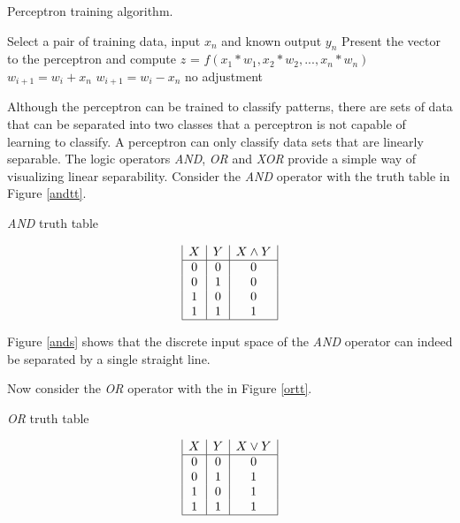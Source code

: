 \begin{algorithm}[htb!]
\caption{Perceptron training algorithm.}
\label{perceptronAlg}    
\begin{algorithmic}

\STATE Select a pair of training data, input $x_n$ and known output $y_n$
\STATE Present the vector to the perceptron and compute $z$ = $f(x_1 * w_1, x_2 * w_2, ..., x_n * w_n)$
\STATE $w_{i+1} = w_i + x_n$
\STATE $w_{i+1} = w_i - x_n$
 \ELSE
\STATE no adjustment
\ENDIF
\ENDWHILE
\end{algorithmic}
\end{algorithm}

Although the perceptron can be trained to classify patterns, there are sets of data that can be separated into two classes that a perceptron is not capable of learning to classify.
A perceptron can only classify data sets that are linearly separable.
The logic operators {\it AND}, {\it OR} and {\it XOR} provide a simple way of visualizing linear separability.
Consider the {\it AND} operator with the truth table in Figure \ref{andtt}.
\begin{table}[htb!]
  \caption{{\it AND} truth table}
  \label{andtt}
\begin{displaymath}
\begin{array}{|c|c|c|}
   X
 & Y
 & X \land Y
\\
\hline
0 & 0 & 0\\
0 & 1 & 0\\
1 & 0 & 0\\
1 & 1 & 1\\
\hline
\end{array}
\end{displaymath}
\end{table}

Figure \ref{ands} shows that the discrete input space of the {\it AND}
operator can indeed be separated by a single straight line.

Now consider the {\it OR} operator with the in Figure \ref{ortt}. 

\begin{table}[h!]
\caption{{\it OR} truth table}
\label{ortt}
\begin{displaymath}
\begin{array}{|c|c|c|}
   X
 & Y
 & X \lor Y
\\
\hline
0 & 0 & 0\\
0 & 1 & 1\\
1 & 0 & 1\\
1 & 1 & 1\\
\hline
\end{array}
\end{displaymath}
\end{table}

